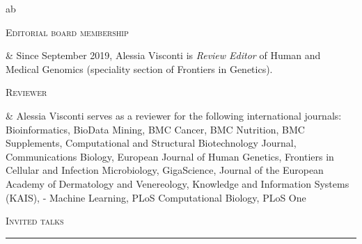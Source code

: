 \documentclass[a4paper,10pt]{article}
\newcommand{\mediumtitle}[1]{
	\vspace{0.2cm}
	{\noindent
	\Large \textsc{#1}\\[-2ex]
	\hrule
	\vspace{0.2cm}}
}
\newenvironment{singletablelist}
{	\vspace{-0.2cm}
	\begin{longtable}[!h]{ab}}{\end{longtable}
}
\newcommand{\stlist}[2]{
	\hspace{-3cm}
	\noindent
	\begin{minipage}{0.24\textwidth}
	\begin{flushright}
	\textsc{#1}
	\end{flushright}
	\end{minipage}
	& #2\\[0.2cm]
}
\begin{document}
\begin{singletablelist}

\stlist{Editorial board membership}{ Since September 2019, Alessia Visconti is \emph{Review Editor} of Human and Medical Genomics (speciality section of Frontiers in Genetics).}
\stlist{Reviewer}{ Alessia Visconti serves as a reviewer for the following international journals: Bioinformatics, BioData Mining, BMC Cancer, BMC Nutrition, BMC Supplements, Computational and Structural Biotechnology Journal, Communications Biology, European Journal of Human Genetics, Frontiers in Cellular and Infection Microbiology, GigaScience, Journal of the European Academy of Dermatology and Venereology, Knowledge and Information Systems (KAIS), - Machine Learning, PLoS Computational Biology, PLoS One
}
\end{singletablelist}



\mediumtitle{Invited talks}
\end{document}
